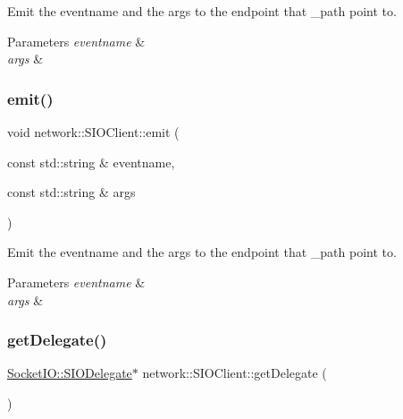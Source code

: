 Emit the eventname and the args to the endpoint that \+\_\+path point to. 
\begin{DoxyParams}{Parameters}
{\em eventname} & \\
\hline
{\em args} & \\
\hline
\end{DoxyParams}
\mbox{\label{classnetwork_1_1SIOClient_a6467c540e8efb9c2f291746f0e0b7ab9}} 
\subsubsection{\texorpdfstring{emit()}{emit()}\hspace{0.1cm}{\footnotesize\ttfamily [2/2]}}
{\footnotesize\ttfamily void network\+::\+S\+I\+O\+Client\+::emit (\begin{DoxyParamCaption}\item[{const std\+::string \&}]{eventname,  }\item[{const std\+::string \&}]{args }\end{DoxyParamCaption})}

Emit the eventname and the args to the endpoint that \+\_\+path point to. 
\begin{DoxyParams}{Parameters}
{\em eventname} & \\
\hline
{\em args} & \\
\hline
\end{DoxyParams}
\mbox{\label{classnetwork_1_1SIOClient_a0129a31808dc90c1423f5b991e0fb9ad}} 
\subsubsection{\texorpdfstring{get\+Delegate()}{getDelegate()}\hspace{0.1cm}{\footnotesize\ttfamily [1/2]}}
{\footnotesize\ttfamily \hyperlink{classnetwork_1_1SocketIO_1_1SIODelegate}{Socket\+I\+O\+::\+S\+I\+O\+Delegate}$\ast$ network\+::\+S\+I\+O\+Client\+::get\+Delegate (\begin{DoxyParamCaption}{ }\end{DoxyParamCaption})\hspace{0.3cm}{\ttfamily [inline]}}


